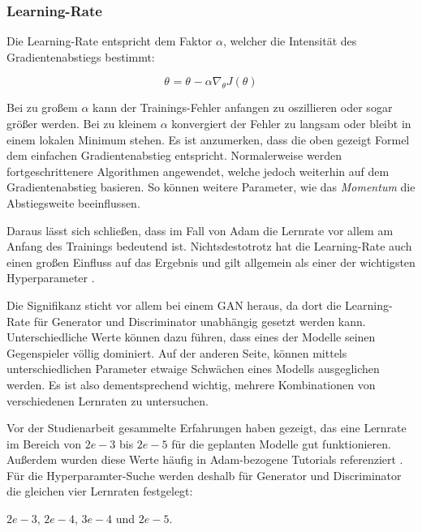 \subsubsection{Learning-Rate}
Die Learning-Rate entspricht dem Faktor \(\alpha\), welcher die Intensität des Gradientenabstiegs bestimmt:  

\[\theta_{}  =  \theta_{}  - \alpha   \nabla_{ \theta }  J( \theta )  \]

Bei zu großem \(\alpha\) kann der Trainings-Fehler anfangen zu oszillieren oder sogar größer werden.
Bei zu kleinem \(\alpha\) konvergiert der Fehler zu langsam oder bleibt in einem lokalen Minimum stehen. 
Es ist anzumerken, dass die oben gezeigt Formel dem einfachen Gradientenabstieg entspricht.
Normalerweise werden fortgeschrittenere Algorithmen angewendet, welche jedoch weiterhin auf dem Gradientenabstieg basieren.
So können weitere Parameter, wie das \textit{Momentum} die Abstiegsweite beeinflussen.
\newline

Daraus lässt sich schließen, dass im Fall von Adam die Lernrate vor allem am Anfang des Trainings bedeutend ist.
Nichtsdestotrotz hat die Learning-Rate auch einen großen Einfluss auf das Ergebnis und gilt allgemein als einer der wichtigsten Hyperparameter \cite[S. 447]{learning-rate-most-important}. 
\newline

Die Signifikanz sticht vor allem bei einem GAN heraus, da dort die Learning-Rate für Generator und Discriminator unabhängig gesetzt werden kann.
Unterschiedliche Werte können dazu führen, dass eines der Modelle seinen Gegenspieler völlig dominiert.
Auf der anderen Seite, können mittels unterschiedlichen Parameter etwaige Schwächen eines Modells ausgeglichen werden.
Es ist also dementsprechend wichtig, mehrere Kombinationen von verschiedenen Lernraten zu untersuchen.
\newline

Vor der Studienarbeit gesammelte Erfahrungen haben gezeigt, das eine Lernrate im Bereich von \(2e-3\) bis \(2e-5\) für die geplanten Modelle gut funktionieren.
Außerdem wurden diese Werte häufig in Adam-bezogene Tutorials referenziert \cite{adam-tutorial}.
Für die Hyperparamter-Suche werden deshalb für Generator und Discriminator die gleichen vier Lernraten festgelegt:

\begin{center} \(2e-3\), \(2e-4\), \(3e-4\) und \(2e-5\). \end{center}

